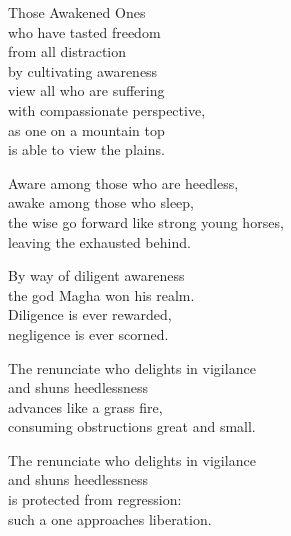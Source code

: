 Those Awakened Ones\\
who have tasted freedom\\
from all distraction\\
by cultivating awareness\\
view all who are suffering\\
with compassionate perspective,\\
as one on a mountain top\\
is able to view the plains.


Aware among those who are heedless,\\
awake among those who sleep,\\
the wise go forward like strong young horses,\\
leaving the exhausted behind.


By way of diligent awareness\\
the god Magha won his realm.\\
Diligence is ever rewarded,\\
negligence is ever scorned.


The renunciate who delights in vigilance\\
and shuns heedlessness\\
advances like a grass fire,\\
consuming obstructions great and small.


The renunciate who delights in vigilance\\
and shuns heedlessness\\
is protected from regression:\\
such a one approaches liberation.

